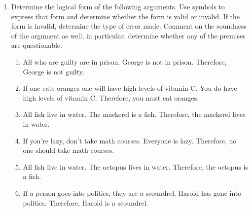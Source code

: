 \begin{enumerate}
\item Determine the logical form of the following arguments.  Use symbols
to express that form and determine whether the form is valid or invalid.
If the form is invalid, determine the type of error made.  Comment on the 
soundness of the argument as well, in particular, determine whether any of
the premises are questionable.
\begin{enumerate}
\item All who are guilty are in prison. \newline
  George is not in prison.  \newline
  Therefore, George is not guilty.
 

\item If one eats oranges one will have high levels of vitamin C. \newline
  You do have high levels of vitamin C. \newline
  Therefore, you must eat oranges.
\item All fish live in water. \newline
  The mackerel is a fish. \newline
  Therefore, the mackerel lives in water. 
\item If you're lazy, don't take math courses.\newline
  Everyone is lazy. \newline
  Therefore, no one should take math courses.
\item All fish live in water. \newline
  The octopus lives in water. \newline
  Therefore, the octopus is a fish.
\item If a person goes into politics, they are a scoundrel.\newline
  Harold has gone into politics. \newline
  Therefore, Harold is a scoundrel. 
\end{enumerate}


\end{enumerate}
